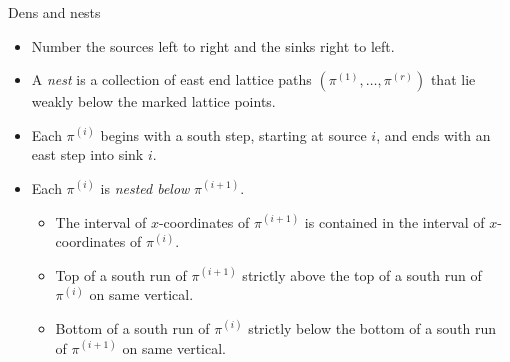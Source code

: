 \documentclass{beamer}
\newcounter{c}
\begin{document}
\begin{frame}{Dens and nests}
  \begin{itemize}
  \item Number the sources left to right and the sinks right to left.\pause
  \item A \emph{nest} is a collection of east end 
      lattice paths \((\pi^{(1)},\ldots,\pi^{(r)})\) that lie weakly below
      the marked lattice points.\pause
  \item Each \(\pi^{(i)}\) begins with a south step, starting at
    source \(i\), and ends with an
    east step into sink \(i\).\pause
  \item Each \(\pi^{(i)}\) is \emph{nested below} \(\pi^{(i+1)}\).\pause
    \begin{itemize}
    \item The interval of \(x\)-coordinates of \(\pi^{(i+1)}\) is
      contained in the interval of \(x\)-coordinates of \(\pi^{(i)}\).\pause
    \item Top of a south run of \(\pi^{(i+1)}\) strictly above the top of a
      south run of \(\pi^{(i)}\) on same vertical.\pause
    \item Bottom of a south run of \(\pi^{(i)}\) strictly below the bottom of a
      south run of \(\pi^{(i+1)}\) on same vertical.\pause
    \end{itemize}
  \end{itemize}
\end{frame}
\end{document}
